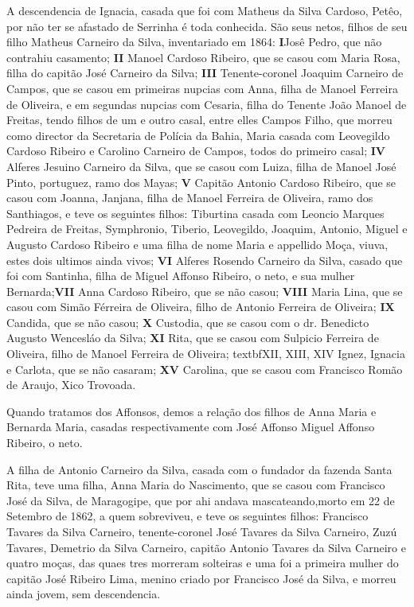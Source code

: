 A descendencia de Ignacia, casada que foi com Matheus da Silva Cardoso, Petêo, por não ter se afastado de Serrinha é toda conhecida. São seus netos, filhos de seu filho Matheus Carneiro da Silva, inventariado em 1864: \textbf{I}Josê Pedro, que não contrahiu casamento; \textbf{II} Manoel Cardoso Ribeiro, que se casou com Maria Rosa, filha do capitão José Carneiro da Silva; \textbf{III} Tenente-coronel Joaquim Carneiro de Campos, que se casou em primeiras nupcias com Anna, filha de Manoel Ferreira de Oliveira, e em segundas nupcias com Cesaria, filha do Tenente João Manoel de Freitas, tendo filhos de um e outro casal, entre elles Campos Filho, que morreu como director da Secretaria de Polícia da Bahia, Maria casada com Leovegildo Cardoso Ribeiro e Carolino Carneiro de Campos, todos do primeiro casal; \textbf{IV} Alferes Jesuino Carneiro da Silva, que se casou com Luiza, filha de Manoel José Pinto, portuguez, ramo dos Mayas; \textbf{V} Capitão Antonio Cardoso Ribeiro, que se casou com Joanna, Janjana, filha de Manoel Ferreira de Oliveira, ramo dos Santhiagos, e teve os seguintes filhos: Tiburtina casada com Leoncio Marques Pedreira de Freitas, Symphronio, Tiberio, Leovegildo, Joaquim, Antonio, Miguel e Augusto Cardoso Ribeiro e uma filha de nome Maria e appellido Moça, viuva, estes dois ultimos ainda vivos; \textbf{VI} Alferes Rosendo Carneiro da Silva, casado que foi com Santinha, filha de Miguel Affonso Ribeiro, o neto, e sua mulher Bernarda;\textbf{VII} Anna Cardoso Ribeiro, que se não casou; \textbf{VIII} Maria Lina, que se casou com Simão Férreira de Oliveira, filho de Antonio Ferreira de
Oliveira; \textbf{IX} Candida, que se não casou; \textbf{X} Custodia, que se casou com o dr. Benedicto Augusto Wencesláo da Silva; \textbf{XI} Rita, que se casou com Sulpicio Ferreira de Oliveira, filho de Manoel Ferreira de Oliveira; textbf{XII, XIII, XIV} Ignez, Ignacia e Carlota, que se não casaram; \textbf{XV} Carolina, que se casou com Francisco Romão de Araujo, Xico Trovoada.

Quando tratamos dos Affonsos, demos a relação dos filhos de Anna Maria e Bernarda Maria, casadas respectivamente com José Affonso Miguel Affonso Ribeiro, o neto.


A filha de Antonio Carneiro da Silva, casada com o fundador da fazenda Santa Rita, teve uma filha, Anna Maria do Nascimento, que
se casou com Francisco José da Silva, de Maragogipe, que por ahi andava mascateando,morto em 22 de Setembro de 1862, a quem sobreviveu, e teve os seguintes filhos: Francisco Tavares da Silva Carneiro, tenente-coronel José Tavares da Silva Carneiro, Zuzú Tavares, Demetrio da Silva Carneiro, capitão Antonio Tavares da Silva Carneiro e quatro moças, das quaes tres morreram solteiras e uma foi a primeira mulher do capitão José Ribeiro Lima, menino criado por Francisco José da Silva, e morreu ainda jovem, sem descendencia.

